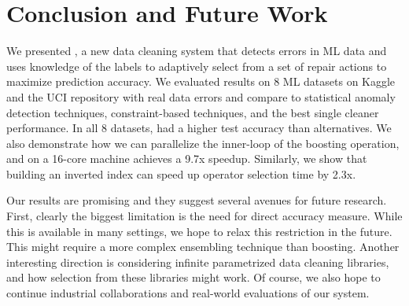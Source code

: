 \section{Conclusion and Future Work}
We presented \sys, a new data cleaning system that detects errors in ML data and uses knowledge of the labels to adaptively select from a set of repair actions to maximize prediction accuracy.
We evaluated results on 8 ML datasets on Kaggle and the UCI repository with real data errors and compare to statistical anomaly detection techniques, constraint-based techniques, and the best single cleaner performance. In all 8 datasets, \sys had a higher test accuracy than alternatives. We also demonstrate how we can parallelize the inner-loop of the boosting operation, and on a 16-core machine \sys achieves a 9.7x speedup. Similarly, we show that building an inverted index can speed up operator selection time by 2.3x.

Our results are promising and they suggest several avenues for future research.
First, clearly the biggest limitation is the need for direct accuracy measure.
While this is available in many settings, we hope to relax this restriction in the future.
This might require a more complex ensembling technique than boosting.
Another interesting direction is considering infinite parametrized data cleaning libraries, and how selection from these libraries might work.
Of course, we also hope to continue industrial collaborations and real-world evaluations of our system.